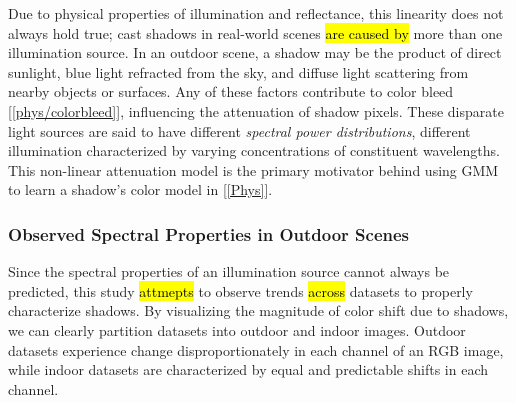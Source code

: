 \documentclass[12pt]{report}
\begin{document}
Due to physical properties of illumination and reflectance, this linearity does not always hold true; cast shadows in real-world scenes \hl{are caused by} more than one illumination source. In an outdoor scene, a shadow may be the product of direct sunlight, blue light refracted from the sky, and diffuse light scattering from nearby objects or surfaces. Any of these factors contribute to color bleed [\ref{phys/colorbleed}], influencing the attenuation of shadow pixels. These disparate light sources are said to have different \textit{spectral power distributions}, different illumination characterized by varying concentrations of constituent wavelengths. This non-linear attenuation model is the primary motivator behind using GMM to learn a shadow's color model in [\ref{Phys}].

\subsubsection{Observed Spectral Properties in Outdoor Scenes}

Since the spectral properties of an illumination source cannot always be predicted, this study \hl{attmepts} to observe trends \hl{across} datasets to properly characterize shadows. By visualizing the magnitude of color shift due to shadows, we can clearly partition datasets into outdoor and indoor images. Outdoor datasets experience change disproportionately in each channel of an RGB image, while indoor datasets are characterized by equal and predictable shifts in each channel.
\end{document}
